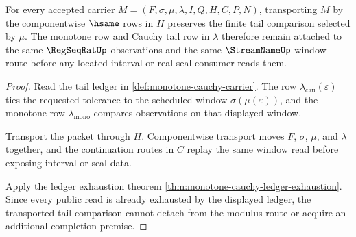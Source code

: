 \begin{theorem}
\label{thm:monotone-cauchy-modulus-tail-stability}
For every accepted carrier $M=(F,\sigma,\mu,\lambda,I,Q,H,C,P,N)$, transporting $M$ by the componentwise $\hsame$ rows in $H$ preserves the finite tail comparison selected by $\mu$. The monotone row and Cauchy tail row in $\lambda$ therefore remain attached to the same $\RegSeqRatUp$ observations and the same $\StreamNameUp$ window route before any located interval or real-seal consumer reads them.
\end{theorem}
\begin{proof}
Read the tail ledger in \autoref{def:monotone-cauchy-carrier}. The row $\lambda_{\mathrm{cau}}(\varepsilon)$ ties the requested tolerance to the scheduled window $\sigma(\mu(\varepsilon))$, and the monotone row $\lambda_{\mathrm{mono}}$ compares observations on that displayed window.

Transport the packet through $H$. Componentwise transport moves $F$, $\sigma$, $\mu$, and $\lambda$ together, and the continuation routes in $C$ replay the same window read before exposing interval or seal data.

Apply the ledger exhaustion theorem \autoref{thm:monotone-cauchy-ledger-exhaustion}. Since every public read is already exhausted by the displayed ledger, the transported tail comparison cannot detach from the modulus route or acquire an additional completion premise.
\end{proof}

